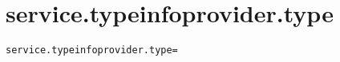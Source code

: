 \section{service.typeinfoprovider.type}
\label{configuration:ServiceTypeinfoproviderType}
\ClearAPI
\TODO
{}
\begin{lstlisting}[style=Props,caption={Usage example for \textit{service.typeinfoprovider.type}}]
service.typeinfoprovider.type=
\end{lstlisting}